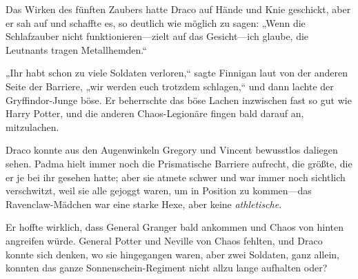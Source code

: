 Das Wirken des fünften Zaubers hatte Draco auf Hände und Knie geschickt, aber er sah auf und schaffte es, so deutlich wie möglich zu sagen: „Wenn die Schlafzauber nicht funktionieren—zielt auf das Gesicht—ich glaube, die Leutnants tragen Metallhemden.“

„Ihr habt schon zu viele Soldaten verloren,“ sagte Finnigan laut von der anderen Seite der Barriere, „wir werden euch trotzdem schlagen,“ und dann lachte der Gryffindor-Junge böse. Er beherrschte das böse Lachen inzwischen fast so gut wie Harry Potter, und die anderen Chaos-Legionäre fingen bald darauf an, mitzulachen.

Draco konnte aus den Augenwinkeln Gregory und Vincent bewusstlos daliegen sehen. Padma hielt immer noch die Prismatische Barriere aufrecht, die größte, die er je bei ihr gesehen hatte; aber sie atmete schwer und war immer noch sichtlich verschwitzt, weil sie alle gejoggt waren, um in Position zu kommen—das Ravenclaw-Mädchen war eine starke Hexe, aber keine \emph{athletische}.

Er hoffte wirklich, dass General Granger bald ankommen und Chaos von hinten angreifen würde. General Potter und Neville von Chaos fehlten, und Draco konnte sich denken, wo sie hingegangen waren, aber zwei Soldaten, ganz allein, konnten das ganze Sonnenschein-Regiment nicht allzu lange aufhalten oder?

\later

